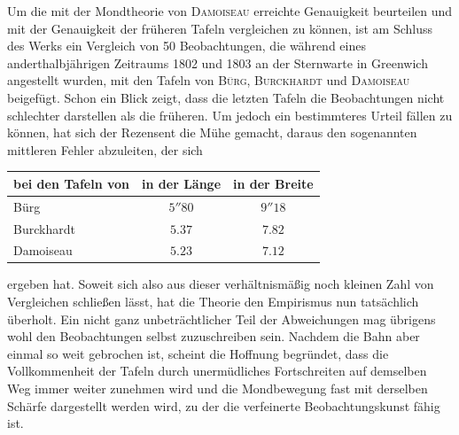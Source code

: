 Um die mit der Mondtheorie von \textsc{Damoiseau} erreichte Genauigkeit beurteilen und mit der Genauigkeit der früheren Tafeln vergleichen zu können, ist am Schluss des Werks ein Vergleich von 50 Beobachtungen, die während eines anderthalbjährigen Zeitraums 1802 und 1803 an der Sternwarte in Greenwich angestellt wurden, mit den Tafeln von \textsc{Bürg}, \textsc{Burckhardt} und \textsc{Damoiseau} beigefügt. Schon ein Blick zeigt, dass die letzten Tafeln die Beobachtungen nicht schlechter darstellen als die früheren. Um jedoch ein bestimmteres Urteil fällen zu können, hat sich der Rezensent die Mühe gemacht, daraus den sogenannten mittleren Fehler abzuleiten, der sich
\begin{center}
\begin{tabular}{l|c|c}
bei den Tafeln von & in der Länge & in der Breite \\
\hline
Bürg & $5''80$ & $9''18$ \\
Burckhardt & $5.37$ & $7.82$ \\
Damoiseau & $5.23$ & $7.12$ \\
\end{tabular}
\end{center}
\noindent ergeben hat. Soweit sich also aus dieser verhältnismäßig noch kleinen Zahl von Vergleichen schließen lässt, hat die Theorie den Empirismus nun tatsächlich überholt.
Ein nicht ganz  unbeträchtlicher Teil der Abweichungen mag übrigens wohl den Beobachtungen selbst zuzuschreiben sein.
Nachdem die Bahn aber einmal so weit gebrochen ist, scheint die Hoffnung begründet, dass die Vollkommenheit der Tafeln durch unermüdliches Fortschreiten auf demselben Weg immer weiter zunehmen wird und die Mondbewegung fast mit derselben Schärfe dargestellt werden wird, zu der die verfeinerte Beobachtungskunst fähig ist.
